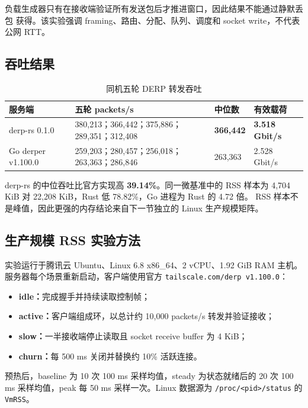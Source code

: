 \documentclass[UTF8,a4paper,zihao=-4]{ctexart}
\newcommand{\code}[1]{\texttt{\small #1}}
\newcommand{\metric}[1]{\textcolor{Primary}{\textbf{#1}}}
\begin{document}
负载生成器只有在接收端验证所有发送包后才推进窗口，因此结果不能通过静默丢包
获得。该实验强调 framing、路由、分配、队列、调度和 socket write，不代表公网 RTT。

\subsection{吞吐结果}

\begin{table}[htbp]
\centering
\small
\begin{tabularx}{\textwidth}{p{}Y R{2.3cm}R{2.2cm}}
\toprule
\textbf{服务端} & \textbf{五轮 packets/s} &
\textbf{中位数} & \textbf{有效载荷} \\
\midrule
derp-rs 0.1.0 &
380,213；366,442；375,886；289,351；312,408 &
\metric{366,442} & \metric{3.518 Gbit/s} \\
Go derper v1.100.0 &
259,203；280,457；256,018；263,363；286,846 &
263,363 & 2.528 Gbit/s \\
\bottomrule
\end{tabularx}
\caption{同机五轮 DERP 转发吞吐}
\end{table}

derp-rs 的中位吞吐比官方实现高 \metric{39.14\%}。同一微基准中的 RSS 样本为
4,704 KiB 对 22,208 KiB，Rust 低 78.82\%，Go 进程为 Rust 的 4.72 倍。
RSS 样本不是峰值，因此更强的内存结论来自下一节独立的 Linux 生产规模矩阵。

\subsection{生产规模 RSS 实验方法}

实验运行于腾讯云 Ubuntu、Linux 6.8 x86\_64、2 vCPU、1.92 GiB RAM 主机。
服务器每个场景重新启动，客户端使用官方 \code{tailscale.com/derp v1.100.0}：

\begin{itemize}
  \item \textbf{idle：}完成握手并持续读取控制帧；
  \item \textbf{active：}客户端组成环，以总计约 10,000 packets/s 转发并验证接收；
  \item \textbf{slow：}一半接收端停止读取且 socket receive buffer 为 4 KiB；
  \item \textbf{churn：}每 500 ms 关闭并替换约 10\% 活跃连接。
\end{itemize}

预热后，baseline 为 10 次 100 ms 采样均值，steady 为状态就绪后的 20 次
100 ms 采样均值，peak 每 50 ms 采样一次。Linux 数据源为
\code{/proc/<pid>/status} 的 \code{VmRSS}。
\end{document}
